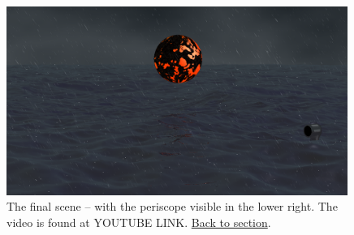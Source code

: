 \documentclass[abstract=off,oneside]{scrreprt}
\begin{document}
\begin{figure}[htb]
\centering
\includegraphics[width=0.99\textwidth]{./img/finalscene.png}
\caption*{\label{fig:finalscene}The final scene -- with the periscope visible in the lower right. The video is found at YOUTUBE LINK. \hyperref[sec:periscope]{Back to section}.}
\end{figure}
\end{document}
